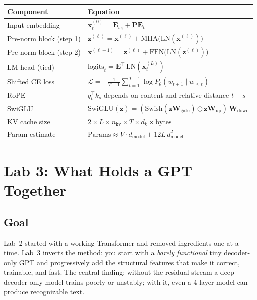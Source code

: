 \begin{center}
\renewcommand{\arraystretch}{1.6}
\begin{tabularx}{\textwidth}{@{}lX@{}}
\toprule
Component & Equation \\
\midrule
Input embedding & $\mathbf{x}_t^{(0)} = \mathbf{E}_{w_t} + \mathbf{PE}_t$ \\[4pt]
Pre-norm block (step 1) & $\mathbf{z}^{(\ell)} = \mathbf{x}^{(\ell)} + \text{MHA}\!\big(\text{LN}(\mathbf{x}^{(\ell)})\big)$ \\[4pt]
Pre-norm block (step 2) & $\mathbf{x}^{(\ell+1)} = \mathbf{z}^{(\ell)} + \text{FFN}\!\big(\text{LN}(\mathbf{z}^{(\ell)})\big)$ \\[4pt]
LM head (tied) & $\text{logits}_t = \mathbf{E}^\top \, \text{LN}(\mathbf{x}_t^{(L)})$ \\[4pt]
Shifted CE loss & $\mathcal{L} = -\frac{1}{T-1}\sum_{t=1}^{T-1} \log P_\theta(w_{t+1} \mid w_{\leq t})$ \\[4pt]
RoPE & $q_t^\top k_s$ depends on content and relative distance $t - s$ \\[4pt]
SwiGLU & $\text{SwiGLU}(\mathbf{z}) = (\text{Swish}(\mathbf{z}\mathbf{W}_\text{gate}) \odot \mathbf{z}\mathbf{W}_\text{up})\,\mathbf{W}_\text{down}$ \\[4pt]
KV cache size & $2 \times L \times n_\text{kv} \times T \times d_k \times \text{bytes}$ \\[4pt]
Param estimate & $\text{Params} \approx V \cdot d_\text{model} + 12 L \, d_\text{model}^2$ \\
\bottomrule
\end{tabularx}
\end{center}


\section*{Lab 3: What Holds a GPT Together}

\subsection*{Goal}

Lab~2 started with a working Transformer and removed ingredients one at a time. Lab~3 inverts the method: you start with a \emph{barely functional} tiny decoder-only GPT and progressively add the structural features that make it correct, trainable, and fast. The central finding: without the residual stream a deep decoder-only model trains poorly or unstably; with it, even a 4-layer model can produce recognizable text.

